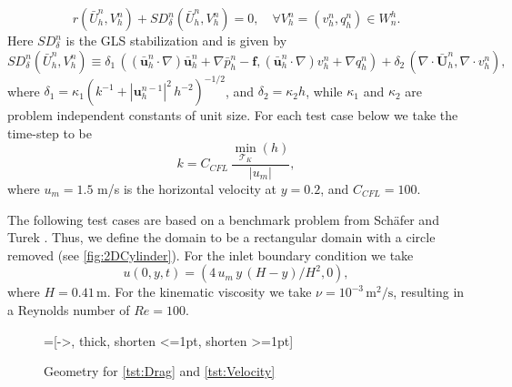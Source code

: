 \begin{equation}
  r(\bar{U}^n_h, V^n_h) + SD_{\delta}^n(\bar{U}^n_h, V^n_h) = 0, \quad \forall
    V^n_h = (v^n_h, q^n_h) \in W^h_n.
  \label{eqn:G2}
\end{equation}
Here $SD_{\delta}^n$ is the GLS stabilization and is given by
\begin{equation}
    SD_{\delta}^n(\bar{U}^n_h, V^n_h) \equiv
        \delta_1\,(\left(\bar{\mathbf{u}}^n_h \cdot \nabla \right)
            \bar{\mathbf{u}}^n_h + \nabla \bar{p}^n_h - \mathbf{f},
        \left(\bar{\mathbf{u}}^n_h \cdot \nabla \right) v^n_h + \nabla q^n_h)
            + \delta_2\,(\nabla \cdot \bar{\mathbf{U}}^n_h, \nabla \cdot v^n_h),
  \label{eqn:NSEStabilization}
\end{equation}
where $\delta_1 = \kappa_1 (k^{-1} + |\mathbf{u}^{n-1}_h|^2\, h^{-2})^{-1/2}$,
and $\delta_2 = \kappa_2 h$, while $\kappa_1$ and $\kappa_2$ are problem
independent constants of unit size. For each test case below we take the
time-step to be
\begin{equation*}
    k = C_{CFL}\, \frac{\min_{\mathcal{T}_K}(h)}{|u_m|},
\end{equation*}
where $u_m = 1.5$ m/s is the horizontal velocity at $y = 0.2$, and
$C_{CFL}=100$.

The following test cases are based on a benchmark problem from Sch\"afer and
Turek \cite[Test case 2D-2]{Schaefer1996}. Thus, we define the domain to be a
rectangular domain with a circle removed (see \autoref{fig:2DCylinder}). For the
inlet boundary condition we take
\begin{equation}
    u(0,y,t) = (4\, u_m\,y\, (H - y)/H^2, 0),
    \label{eqn:2DInlet}
\end{equation}
where $H = 0.41\, \text{m}$. For the kinematic
viscosity we take $\nu = 10^{-3}\, \text{m}^2\text{/s}$, resulting in a
Reynolds number of $Re=100$.

\begin{figure}[h]
    \centering
    =[->, thick, shorten <=1pt, shorten >=1pt]
    \caption{Geometry for \autoref{tst:Drag} and \autoref{tst:Velocity}}
    \label{fig:2DCylinder}
\end{figure}

